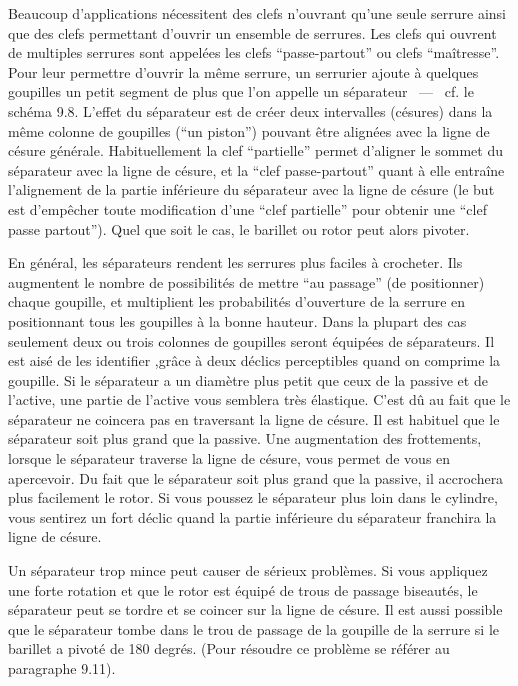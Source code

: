 \documentclass[a4paper,french,11pt,twoside]{report}
\begin{document}
Beaucoup d'applications nécessitent des clefs n'ouvrant qu'une seule serrure ainsi que des clefs permettant d'ouvrir un ensemble de serrures. Les clefs qui ouvrent de multiples serrures sont appelées les clefs \enquote{passe-partout} ou clefs \enquote{maîtresse}. Pour leur permettre d'ouvrir la même serrure, un serrurier ajoute à quelques goupilles un petit segment de plus que l'on appelle un séparateur ~---~ cf. le schéma 9.8. L'effet du séparateur est de créer deux intervalles (césures) dans la même colonne de goupilles (\enquote{un piston}) pouvant être alignées avec la ligne de césure générale. Habituellement la clef \enquote{partielle} permet d'aligner le sommet du séparateur avec la ligne de césure, et la \enquote{clef passe-partout} quant à elle entraîne l'alignement de la partie inférieure du séparateur avec la ligne de césure (le but est d'empêcher toute modification d'une \enquote{clef partielle} pour obtenir une \enquote{clef passe partout}). Quel que soit le cas, le barillet ou rotor peut alors pivoter.

En général, les séparateurs rendent les serrures plus faciles à crocheter. Ils augmentent le nombre de possibilités de mettre \enquote{au passage} (de positionner) chaque goupille, et multiplient les probabilités d'ouverture de la serrure en positionnant tous les goupilles à la bonne hauteur. Dans la plupart des cas seulement deux ou trois colonnes de goupilles seront équipées de séparateurs. Il est aisé de les identifier ,grâce à deux déclics perceptibles quand on comprime la goupille. Si le séparateur a un diamètre plus petit que ceux de la passive et de l'active, une partie de l'active vous semblera très élastique. C'est dû au fait que le séparateur ne coincera pas en traversant la ligne de césure. Il est habituel que le séparateur soit plus grand que la passive. Une augmentation des frottements, lorsque le séparateur traverse la ligne de césure, vous permet de vous en apercevoir. Du fait que le séparateur soit plus grand que la passive, il accrochera plus facilement le rotor. Si vous poussez le séparateur plus loin dans le cylindre, vous sentirez un fort déclic quand la partie inférieure du séparateur franchira la ligne de césure.

Un séparateur trop mince peut causer de sérieux problèmes. Si vous appliquez une forte rotation et que le rotor est équipé de trous de passage biseautés, le séparateur peut se tordre et se coincer sur la ligne de césure. Il est aussi possible que le séparateur tombe dans le trou de passage de la goupille de la serrure si le barillet a pivoté de 180 degrés. (Pour résoudre ce problème se référer au paragraphe 9.11).
\end{document}
